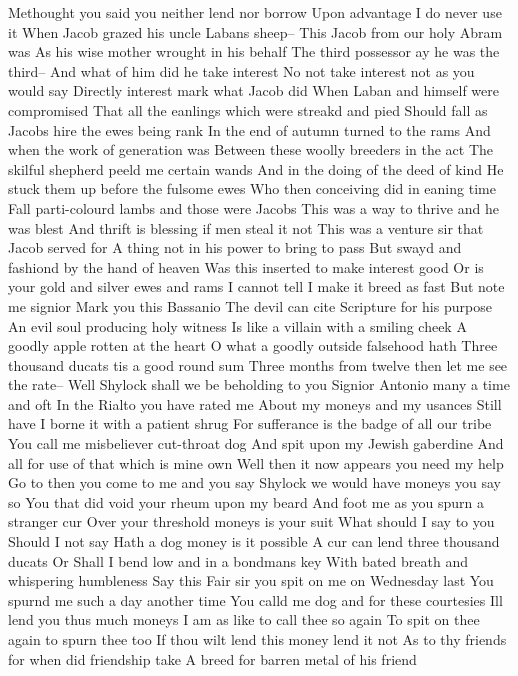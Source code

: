 Methought you said you neither lend nor borrow
Upon advantage
I do never use it
When Jacob grazed his uncle Labans sheep--
This Jacob from our holy Abram was
As his wise mother wrought in his behalf
The third possessor ay he was the third--
And what of him did he take interest
No not take interest not as you would say
Directly interest mark what Jacob did
When Laban and himself were compromised
That all the eanlings which were streakd and pied
Should fall as Jacobs hire the ewes being rank
In the end of autumn turned to the rams
And when the work of generation was
Between these woolly breeders in the act
The skilful shepherd peeld me certain wands
And in the doing of the deed of kind
He stuck them up before the fulsome ewes
Who then conceiving did in eaning time
Fall parti-colourd lambs and those were Jacobs
This was a way to thrive and he was blest
And thrift is blessing if men steal it not
This was a venture sir that Jacob served for
A thing not in his power to bring to pass
But swayd and fashiond by the hand of heaven
Was this inserted to make interest good
Or is your gold and silver ewes and rams
I cannot tell I make it breed as fast
But note me signior
Mark you this Bassanio
The devil can cite Scripture for his purpose
An evil soul producing holy witness
Is like a villain with a smiling cheek
A goodly apple rotten at the heart
O what a goodly outside falsehood hath
Three thousand ducats tis a good round sum
Three months from twelve then let me see the rate--
Well Shylock shall we be beholding to you
Signior Antonio many a time and oft
In the Rialto you have rated me
About my moneys and my usances
Still have I borne it with a patient shrug
For sufferance is the badge of all our tribe
You call me misbeliever cut-throat dog
And spit upon my Jewish gaberdine
And all for use of that which is mine own
Well then it now appears you need my help
Go to then you come to me and you say
Shylock we would have moneys you say so
You that did void your rheum upon my beard
And foot me as you spurn a stranger cur
Over your threshold moneys is your suit
What should I say to you Should I not say
Hath a dog money is it possible
A cur can lend three thousand ducats Or
Shall I bend low and in a bondmans key
With bated breath and whispering humbleness Say this
Fair sir you spit on me on Wednesday last
You spurnd me such a day another time
You calld me dog and for these courtesies
Ill lend you thus much moneys
I am as like to call thee so again
To spit on thee again to spurn thee too
If thou wilt lend this money lend it not
As to thy friends for when did friendship take
A breed for barren metal of his friend
